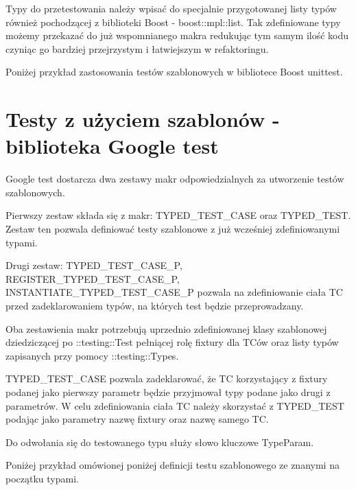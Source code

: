 \documentclass[12pt,a4paper,notitlepage]{report}
\begin{document}
Typy do przetestowania należy wpisać do specjalnie przygotowanej listy typów również pochodzącej z biblioteki Boost - boost::mpl::list. Tak zdefiniowane typy możemy przekazać do już wspomnianego makra redukując tym samym ilość kodu czyniąc go bardziej przejrzystym i łatwiejszym w refaktoringu.

Poniżej przykład zastosowania testów szablonowych w bibliotece Boost unittest.

			

\section{Testy z użyciem szablonów - biblioteka Google test}

Google test dostarcza dwa zestawy makr odpowiedzialnych za utworzenie testów szablonowych.

Pierwszy zestaw składa się z makr: TYPED{\_}TEST{\_}CASE oraz TYPED{\_}TEST. Zestaw ten pozwala definiować testy szablonowe z już wcześniej zdefiniowanymi typami.

Drugi zestaw: TYPED{\_}TEST{\_}CASE{\_}P, REGISTER{\_}TYPED{\_}TEST{\_}CASE{\_}P, INSTANTIATE{\_}TYPED{\_}TEST{\_}CASE{\_}P pozwala na zdefiniowanie ciała TC przed zadeklarowaniem typów, na których test będzie przeprowadzany.

Oba zestawienia makr potrzebują uprzednio zdefiniowanej klasy szablonowej dziedziczącej po ::testing::Test pełniącej rolę fixtury dla TCów oraz listy typów zapisanych przy pomocy ::testing::Types.

TYPED{\_}TEST{\_}CASE pozwala zadeklarować, że TC korzystający z fixtury podanej jako pierwszy parametr będzie przyjmował typy podane jako drugi z parametrów. W celu zdefiniowania ciała TC należy skorzystać z TYPED{\_}TEST podając jako parametry nazwę fixtury oraz nazwę samego TC.

Do odwołania się do testowanego typu służy słowo kluczowe TypeParam.

Poniżej przykład omówionej poniżej definicji testu szablonowego ze znanymi na początku typami.

			
\end{document}
